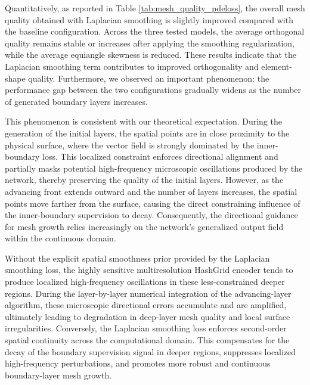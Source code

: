 \documentclass[%
 aip,
 amsmath,amssymb,
 reprint,%
nobibnotes,
]{revtex4-1}
\newcounter{algorithm}
\begin{document}
Quantitatively, as reported in Table \ref{tab:mesh_quality_pdeloss}, the overall mesh quality obtained with Laplacian smoothing is slightly improved compared with the baseline configuration. Across the three tested models, the average orthogonal quality remains stable or increases after applying the smoothing regularization, while the average equiangle skewness is reduced. These results indicate that the Laplacian smoothing term contributes to improved orthogonality and element-shape quality. Furthermore, we observed an important phenomenon: the performance gap between the two configurations gradually widens as the number of generated boundary layers increases.

This phenomenon is consistent with our theoretical expectation.
During the generation of the initial layers, the spatial points are in close proximity to the physical surface, where the vector field is strongly dominated by the inner-boundary loss.
This localized constraint enforces directional alignment and partially masks potential high-frequency microscopic oscillations produced by the network, thereby preserving the quality of the initial layers.
However, as the advancing front extends outward and the number of layers increases, the spatial points move farther from the surface, causing the direct constraining influence of the inner-boundary supervision to decay.
Consequently, the directional guidance for mesh growth relies increasingly on the network's generalized output field within the continuous domain.

Without the explicit spatial smoothness prior provided by the Laplacian smoothing loss, the highly sensitive multiresolution HashGrid encoder tends to produce localized high-frequency oscillations in these less-constrained deeper regions.
During the layer-by-layer numerical integration of the advancing-layer algorithm, these microscopic directional errors accumulate and are amplified, ultimately leading to degradation in deep-layer mesh quality and local surface irregularities. Conversely, the Laplacian smoothing loss enforces second-order spatial continuity across the computational domain. This compensates for the decay of the boundary supervision signal in deeper regions, suppresses localized high-frequency perturbations, and promotes more robust and continuous boundary-layer mesh growth.
\end{document}
